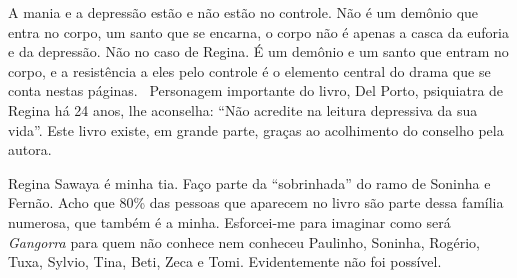 {A mania e a depressão estão e não estão no controle. Não é um demônio
que entra no corpo, um santo que se encarna, o corpo não é apenas a
casca da euforia e da depressão. Não no caso de Regina. É um demônio e
um santo que entram no corpo, e a resistência a eles pelo controle é o
elemento central do drama que se conta nestas páginas.~ Personagem
importante do livro, Del Porto, psiquiatra de Regina há 24 anos, lhe
aconselha: ``Não acredite na leitura depressiva da sua vida''. Este
livro existe, em grande parte, graças ao acolhimento do conselho pela
autora.}

\asterisc

Regina Sawaya é minha tia. Faço parte da ``sobrinhada'' do ramo de
Soninha e Fernão. Acho que 80\% das pessoas que aparecem no
livro são parte dessa família numerosa, que também é a minha.
Esforcei-me para imaginar como será \emph{Gangorra} para quem não
conhece nem conheceu Paulinho, Soninha, Rogério, Tuxa, Sylvio, Tina,
Beti, Zeca e Tomi. Evidentemente não foi possível.
